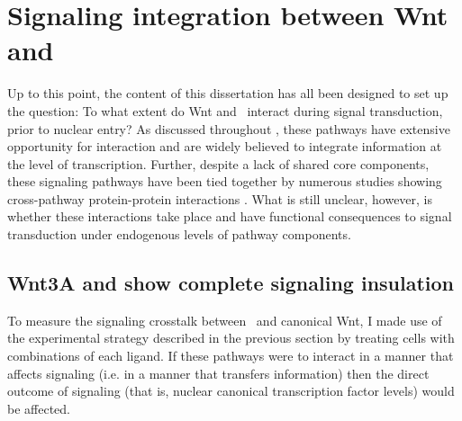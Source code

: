 \section{Signaling integration between Wnt and \tgfbsf}
\label{insulation:wntTgfb}

Up to this point, the content of this dissertation has
all been designed to set up the question: To what extent
do Wnt and \tgfbsf\ interact during signal transduction,
prior to nuclear entry? As discussed throughout
, these pathways have extensive
opportunity for interaction and are widely believed to
integrate information at the level of transcription. Further,
despite a lack of shared core components, these signaling
pathways have been tied together by numerous studies
showing cross-pathway protein-protein
interactions . What is still unclear,
however, is whether these interactions take place and have
functional consequences to signal transduction under endogenous levels of
pathway components.


\subsection{Wnt3A and  show complete signaling insulation}


To measure the signaling crosstalk between \tgf\ and canonical
Wnt,
I made use of the experimental strategy described in the previous
section by treating cells with combinations of each ligand.
If these pathways
were to interact in a manner that affects signaling (i.e.
in a manner that transfers information) then
the direct outcome of signaling (that is, nuclear canonical
transcription factor levels) would be affected.


